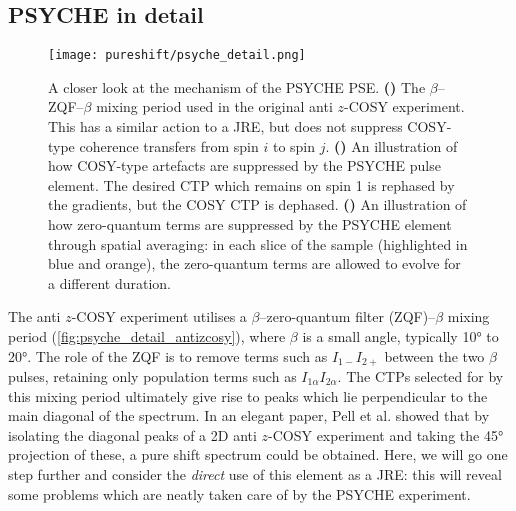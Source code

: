 \subsection{PSYCHE in detail}
\label{subsec:pureshift__psyche_analysis}

\begin{figure}[ht]
    \centering
    \texttt{[image: pureshift/psyche\_detail.png]}%
    {\label{fig:psyche_detail_antizcosy}}%
    {\label{fig:psyche_detail_cosy_suppress}}%
    {\label{fig:psyche_detail_zqc_suppress}}%
    \caption[Detailed analysis of anti $z$-COSY and PSYCHE]{
        A closer look at the mechanism of the PSYCHE PSE.
        \textbf{()} The $\beta$--ZQF--$\beta$ mixing period used in the original anti $z$-COSY experiment. This has a similar action to a JRE, but does not suppress COSY-type coherence transfers from spin $i$ to spin $j$.
        \textbf{()} An illustration of how COSY-type artefacts are suppressed by the PSYCHE pulse element. The desired CTP which remains on spin 1 is rephased by the gradients, but the COSY CTP is dephased.
        \textbf{()} An illustration of how zero-quantum terms are suppressed by the PSYCHE element through spatial averaging: in each slice of the sample (highlighted in blue and orange), the zero-quantum terms are allowed to evolve for a different duration.
    }
    \label{fig:psyche_detail}
\end{figure}

The anti $z$-COSY experiment utilises a $\beta$--zero-quantum filter (ZQF)--$\beta$ mixing period (\cref{fig:psyche_detail_antizcosy}), where $\beta$ is a small angle, typically \ang{10} to \ang{20}.
The role of the ZQF\autocite{Thrippleton2003ACIE} is to remove terms such as $I_{1-}I_{2+}$ between the two $\beta$ pulses, retaining only population terms such as $I_{1\alpha}I_{2\alpha}$.
The CTPs selected for by this mixing period ultimately give rise to peaks which lie perpendicular to the main diagonal of the spectrum.
In an elegant paper, Pell et al.\autocite{Pell2007MRC} showed that by isolating the diagonal peaks of a 2D anti $z$-COSY experiment and taking the \ang{45} projection of these, a pure shift spectrum could be obtained.
Here, we will go one step further and consider the \textit{direct} use of this element as a JRE: this will reveal some problems which are neatly taken care of by the PSYCHE experiment.

